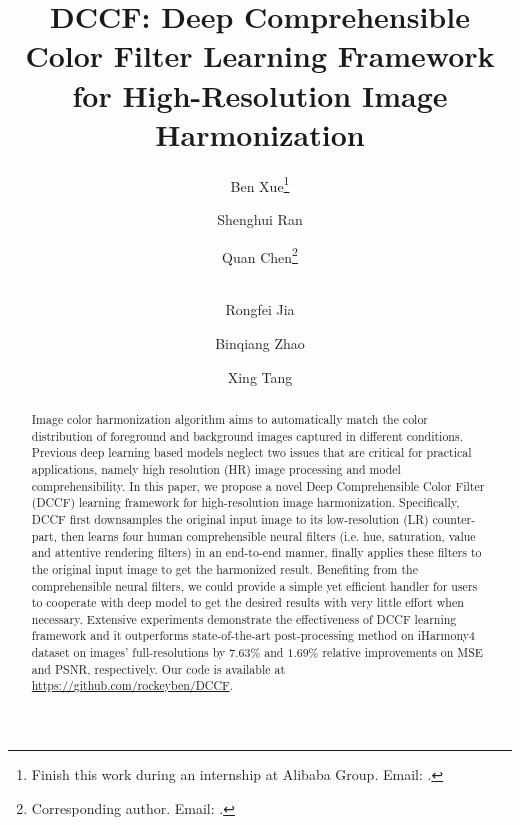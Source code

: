 \documentclass[runningheads]{llncs}
\begin{document}
\pagestyle{headings}
\mainmatter
\def\ECCVSubNumber{5142}  

\title{DCCF: Deep Comprehensible Color Filter Learning Framework for High-Resolution Image Harmonization} 

\begin{comment}
\titlerunning{ECCV-22 submission ID \ECCVSubNumber} 
\authorrunning{ECCV-22 submission ID \ECCVSubNumber} 
\author{Anonymous ECCV submission}
\institute{Paper ID \ECCVSubNumber}
\end{comment}


\author{Ben Xue\thanks{Finish this work during an internship at Alibaba Group. Email: .}\and
Shenghui Ran \and
Quan Chen\thanks{Corresponding author. Email: . }\and \\
Rongfei Jia\and
Binqiang Zhao\and
Xing Tang\\
}
\maketitle


\begin{abstract}


    Image color harmonization algorithm aims to automatically match the color distribution of foreground and background images captured in different conditions.
    Previous deep learning based models neglect two issues that are critical for practical applications, namely high resolution (HR) image processing and model comprehensibility.
    In this paper, we propose a novel Deep Comprehensible Color Filter (DCCF) learning framework for high-resolution image harmonization.
    Specifically, DCCF first downsamples the original input image to its low-resolution (LR) counter-part, then learns four human comprehensible neural filters (i.e. hue, saturation, value and attentive rendering filters) in an end-to-end manner, finally applies these filters to the original input image to get the harmonized result.
    Benefiting from the comprehensible neural filters, we could provide a simple yet efficient handler for users to cooperate with deep model to get the desired results with very little effort when necessary.
    Extensive experiments demonstrate the effectiveness of DCCF learning framework and it outperforms state-of-the-art post-processing method on iHarmony4 dataset on images' full-resolutions by $7.63\%$ and $1.69\%$ relative improvements on MSE and PSNR, respectively. Our code is available at \url{https://github.com/rockeyben/DCCF}.
    
    
    
    \end{abstract}
    
\end{document}
